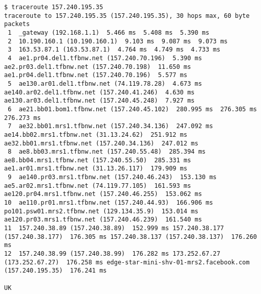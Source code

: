 \documentclass[a4paper]{article}
\begin{document}
\begin{lstlisting}
$ traceroute 157.240.195.35
traceroute to 157.240.195.35 (157.240.195.35), 30 hops max, 60 byte packets
 1  _gateway (192.168.1.1)  5.466 ms  5.408 ms  5.390 ms
 2  10.190.160.1 (10.190.160.1)  9.103 ms  9.087 ms  9.073 ms
 3  163.53.87.1 (163.53.87.1)  4.764 ms  4.749 ms  4.733 ms
 4  ae1.pr04.del1.tfbnw.net (157.240.70.196)  5.390 ms ae2.pr03.del1.tfbnw.net (157.240.70.198)  11.650 ms ae1.pr04.del1.tfbnw.net (157.240.70.196)  5.577 ms
 5  ae130.ar01.del1.tfbnw.net (74.119.78.28)  4.673 ms ae140.ar02.del1.tfbnw.net (157.240.41.246)  4.630 ms ae130.ar03.del1.tfbnw.net (157.240.45.248)  7.927 ms
 6  ae21.bb01.bom1.tfbnw.net (157.240.45.102)  280.995 ms  276.305 ms  276.273 ms
 7  ae32.bb01.mrs1.tfbnw.net (157.240.34.136)  247.092 ms ae14.bb02.mrs1.tfbnw.net (31.13.24.62)  251.912 ms ae32.bb01.mrs1.tfbnw.net (157.240.34.136)  247.012 ms
 8  ae8.bb03.mrs1.tfbnw.net (157.240.55.48)  285.394 ms ae8.bb04.mrs1.tfbnw.net (157.240.55.50)  285.331 ms ae1.ar01.mrs1.tfbnw.net (31.13.26.117)  179.909 ms
 9  ae140.pr03.mrs1.tfbnw.net (157.240.46.243)  153.130 ms ae5.ar02.mrs1.tfbnw.net (74.119.77.105)  161.593 ms ae120.pr04.mrs1.tfbnw.net (157.240.46.255)  153.062 ms
10  ae110.pr01.mrs1.tfbnw.net (157.240.44.93)  166.906 ms po101.psw01.mrs2.tfbnw.net (129.134.35.9)  153.014 ms ae120.pr03.mrs1.tfbnw.net (157.240.46.239)  161.540 ms
11  157.240.38.89 (157.240.38.89)  152.999 ms 157.240.38.177 (157.240.38.177)  176.305 ms 157.240.38.137 (157.240.38.137)  176.260 ms
12  157.240.38.99 (157.240.38.99)  176.282 ms 173.252.67.27 (173.252.67.27)  176.258 ms edge-star-mini-shv-01-mrs2.facebook.com (157.240.195.35)  176.241 ms

UK


\end{lstlisting}
\end{document}
